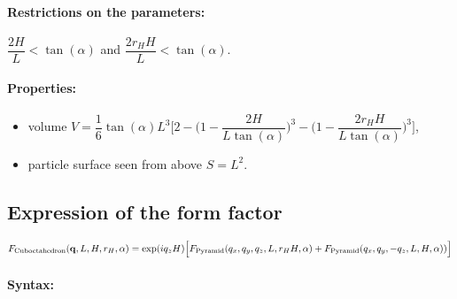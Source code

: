 \paragraph{Restrictions on the parameters:} $\dfrac{2H}{L}< \tan(\alpha)$ and $\dfrac{2r_HH}{L}< \tan(\alpha)$.

\paragraph{Properties:}
\begin{itemize}
\item volume $ V= \dfrac{1}{6} \tan(\alpha)L^3 \Big[ 2
         - \Big(1 - \dfrac{2H }{L\tan(\alpha)} \Big)^3
           - \Big(1 - \dfrac{2 r_H
             H}{L\tan(\alpha) }\Big)^3\Big]$,
\item particle surface seen from above $S =L^2$.
\end{itemize}

\subsection{Expression of the form factor}
\begin{equation*}
F_{\rm{Cuboctahedron}}(\mathbf{q}, L, H, r_H, \alpha)=\exp(iq_z
H)\Big[F_{\rm{Pyramid}}(q_x,q_y, q_z, L, r_H H,
\alpha)+F_{\rm{Pyramid}}(q_x, q_y, -q_z, L, H, \alpha))\Big]
\end{equation*}

\paragraph{Syntax:} 

